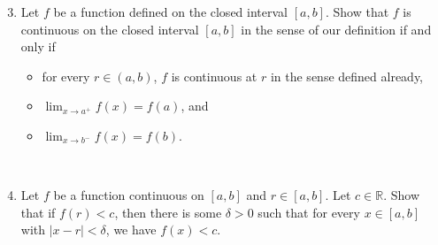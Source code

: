 \documentclass[12pt]{amsart}
\newcommand{\R}{\mathbb{R}}
\begin{document}
\begin{enumerate}
\setcounter{enumi}{2}
\item Let $f$ be a function defined on the closed interval $[a,b]$. Show that $f$ is continuous on the closed interval $[a,b]$ in the sense of our definition if and only if
\begin{itemize}
\item for every $r \in (a,b)$, $f$ is continuous at $r$ in the sense defined already,
\item $\lim_{x\to a^{+}} f(x) = f(a)$, and
\item $\lim_{x\to b^{-}} f(x) = f(b)$.
\end{itemize}

\

\item Let $f$ be a function continuous on $[a,b]$ and $r\in [a,b]$. Let $c\in \R$. Show that if $f(r) < c$, then there is some $\delta>0$ such that for every $x\in [a,b]$ with $|x-r|<\delta$, we have $f(x)<c$.
\end{enumerate}
\end{document}
